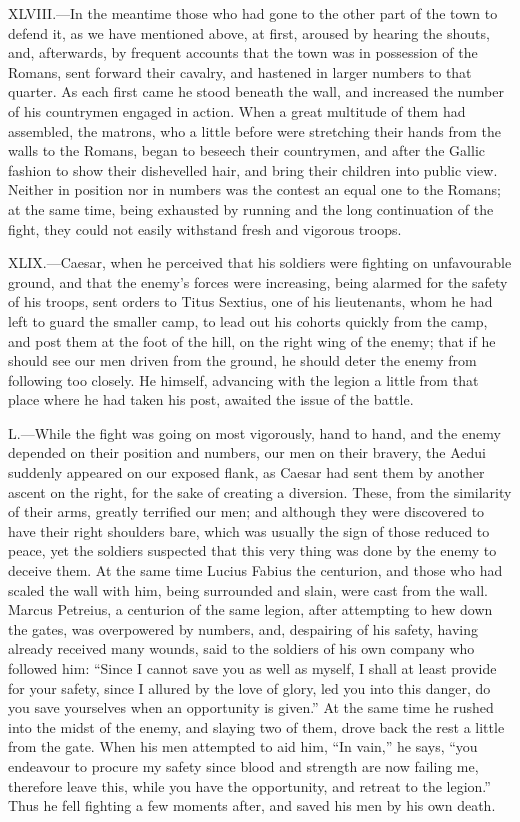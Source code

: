 XLVIII.—In the meantime those who had gone to the other part of the
town to defend it, as we have mentioned above, at first, aroused by
hearing the shouts, and, afterwards, by frequent accounts that the town
was in possession of the Romans, sent forward their cavalry, and
hastened in larger numbers to that quarter. As each first came he stood
beneath the wall, and increased the number of his countrymen engaged in
action. When a great multitude of them had assembled, the matrons, who a
little before were stretching their hands from the walls to the Romans,
began to beseech their countrymen, and after the Gallic fashion to show
their dishevelled hair, and bring their children into public view.
Neither in position nor in numbers was the contest an equal one to the
Romans; at the same time, being exhausted by running and the long
continuation of the fight, they could not easily withstand fresh and
vigorous troops.

XLIX.—Caesar, when he perceived that his soldiers were fighting on
unfavourable ground, and that the enemy's forces were increasing, being
alarmed for the safety of his troops, sent orders to Titus Sextius, one
of his lieutenants, whom he had left to guard the smaller camp, to lead
out his cohorts quickly from the camp, and post them at the foot of the
hill, on the right wing of the enemy; that if he should see our men
driven from the ground, he should deter the enemy from following too
closely. He himself, advancing with the legion a little from that place
where he had taken his post, awaited the issue of the battle.

L.—While the fight was going on most vigorously, hand to hand, and the
enemy depended on their position and numbers, our men on their bravery,
the Aedui suddenly appeared on our exposed flank, as Caesar had sent
them by another ascent on the right, for the sake of creating a
diversion. These, from the similarity of their arms, greatly terrified
our men; and although they were discovered to have their right shoulders
bare, which was usually the sign of those reduced to peace, yet the
soldiers suspected that this very thing was done by the enemy to deceive
them. At the same time Lucius Fabius the centurion, and those who had
scaled the wall with him, being surrounded and slain, were cast from the
wall. Marcus Petreius, a centurion of the same legion, after attempting
to hew down the gates, was overpowered by numbers, and, despairing of
his safety, having already received many wounds, said to the soldiers of
his own company who followed him: ``Since I cannot save you as well as
myself, I shall at least provide for your safety, since I allured by the
love of glory, led you into this danger, do you save yourselves when an
opportunity is given.'' At the same time he rushed into the midst of the
enemy, and slaying two of them, drove back the rest a little from the
gate. When his men attempted to aid him, ``In vain,'' he says, ``you
endeavour to procure my safety since blood and strength are now failing
me, therefore leave this, while you have the opportunity, and retreat to
the legion.'' Thus he fell fighting a few moments after, and saved his
men by his own death.

